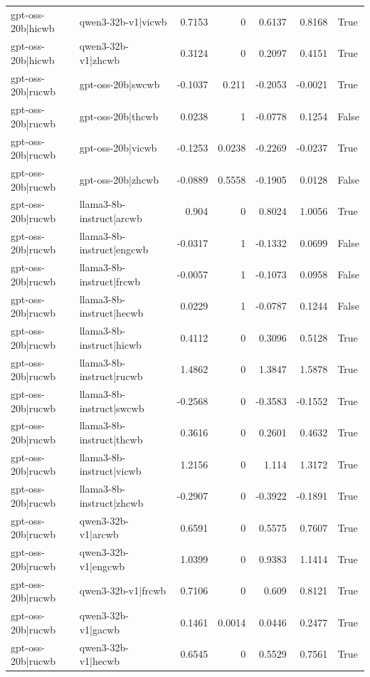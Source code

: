 \begin{table}
\begin{tabular}{l l r r r r l}
gpt-oss-20b|hicwb & qwen3-32b-v1|vicwb & 0.7153 & 0 & 0.6137 & 0.8168 & True \\
gpt-oss-20b|hicwb & qwen3-32b-v1|zhcwb & 0.3124 & 0 & 0.2097 & 0.4151 & True \\
gpt-oss-20b|rucwb & gpt-oss-20b|swcwb & -0.1037 & 0.211 & -0.2053 & -0.0021 & True \\
gpt-oss-20b|rucwb & gpt-oss-20b|thcwb & 0.0238 & 1 & -0.0778 & 0.1254 & False \\
gpt-oss-20b|rucwb & gpt-oss-20b|vicwb & -0.1253 & 0.0238 & -0.2269 & -0.0237 & True \\
gpt-oss-20b|rucwb & gpt-oss-20b|zhcwb & -0.0889 & 0.5558 & -0.1905 & 0.0128 & False \\
gpt-oss-20b|rucwb & llama3-8b-instruct|arcwb & 0.904 & 0 & 0.8024 & 1.0056 & True \\
gpt-oss-20b|rucwb & llama3-8b-instruct|engcwb & -0.0317 & 1 & -0.1332 & 0.0699 & False \\
gpt-oss-20b|rucwb & llama3-8b-instruct|frcwb & -0.0057 & 1 & -0.1073 & 0.0958 & False \\
gpt-oss-20b|rucwb & llama3-8b-instruct|hecwb & 0.0229 & 1 & -0.0787 & 0.1244 & False \\
gpt-oss-20b|rucwb & llama3-8b-instruct|hicwb & 0.4112 & 0 & 0.3096 & 0.5128 & True \\
gpt-oss-20b|rucwb & llama3-8b-instruct|rucwb & 1.4862 & 0 & 1.3847 & 1.5878 & True \\
gpt-oss-20b|rucwb & llama3-8b-instruct|swcwb & -0.2568 & 0 & -0.3583 & -0.1552 & True \\
gpt-oss-20b|rucwb & llama3-8b-instruct|thcwb & 0.3616 & 0 & 0.2601 & 0.4632 & True \\
gpt-oss-20b|rucwb & llama3-8b-instruct|vicwb & 1.2156 & 0 & 1.114 & 1.3172 & True \\
gpt-oss-20b|rucwb & llama3-8b-instruct|zhcwb & -0.2907 & 0 & -0.3922 & -0.1891 & True \\
gpt-oss-20b|rucwb & qwen3-32b-v1|arcwb & 0.6591 & 0 & 0.5575 & 0.7607 & True \\
gpt-oss-20b|rucwb & qwen3-32b-v1|engcwb & 1.0399 & 0 & 0.9383 & 1.1414 & True \\
gpt-oss-20b|rucwb & qwen3-32b-v1|frcwb & 0.7106 & 0 & 0.609 & 0.8121 & True \\
gpt-oss-20b|rucwb & qwen3-32b-v1|gacwb & 0.1461 & 0.0014 & 0.0446 & 0.2477 & True \\
gpt-oss-20b|rucwb & qwen3-32b-v1|hecwb & 0.6545 & 0 & 0.5529 & 0.7561 & True \\

\end{tabular}
\end{table}
